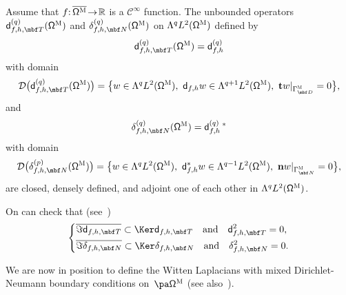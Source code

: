 \begin{proposition}
\begin{enumeratei}
\item\label{pr.QTNii}
Assume that $f{:}\,\overline{\mathsf \Omega^{\textsc{M}}}\!\to\! \mathbb R$ is a $\mathcal C^\infty$ function. The unbounded operators $\mathsf d_{f,h,\mbf T}^{(q)} (\mathsf \Omega^{\textsc{M}})$ and $\delta_{f,h,\mbf N}^{(q)} (\mathsf \Omega^{\textsc{M}})$ on $\Lambda^{q} L^{2} (\mathsf \Omega^{\textsc{M}})$
defined by
\[
\mathsf d_{f,h,\mbf T}^{(q)} (\mathsf \Omega^{\textsc{M}}) = \mathsf d_{f,h}^{(q)}
\]
with domain
\[
\mathcal D\bigl(\mathsf d_{f,h,\mbf T}^{(q)} (\mathsf \Omega^{\textsc{M}})\bigr)=\bigl\{w\in \Lambda^{q}L^2 (\mathsf \Omega^{\textsc{M}}),\ \mathsf d_{f,h}w \in \Lambda^{q+1}L^2(\mathsf \Omega^{\textsc{M}}),\ \mathbf{t}w|_{\Gamma^{\textsc{M}}_{\mbf D}}=0 \bigr\},
\]
and
\[
\delta_{f,h,\mbf N}^{(q)} (\mathsf \Omega^{\textsc{M}}) = \mathsf d_{f,h}^{(q)} \,^*
\]
with domain
\[
\mathcal D\bigl(\delta_{f,h,\mbf N}^{(p)} (\mathsf \Omega^{\textsc{M}})\bigr)=\bigl\{w\in \Lambda^{q} L^2 (\mathsf \Omega^{\textsc{M}}),\ \mathsf d^*_{f,h}w\in \Lambda^{q-1}L^2(\mathsf \Omega^{\textsc{M}}),\ \mathbf{n}w|_{\Gamma^{\textsc{M}}_{\mbf N}}=0 \bigr\},
\]
are closed, densely defined, and adjoint one of each other in $\Lambda^{q}L^2 (\mathsf \Omega^{\textsc{M}})$.
\end{enumeratei}
\end{proposition}

On can check that (see~\cite[Eq.\,(130]{DLLN})
\begin{equation}\label{eq.dom-dT}
\left\{
\begin{aligned}
&\overline{ \Im \mathsf d_{f,h,\mbf T}}\subset \Ker \mathsf d_{f,h,\mbf T} \quad\text{and}\quad \mathsf d_{f,h,\mbf T}^{2}=0,\\
&\overline{ \Im \delta_{f,h,\mbf N}}\subset \Ker \delta_{f,h,\mbf N} \quad\text{and}\quad
\delta_{f,h,\mbf N}^{2}=0.
\end{aligned}
\right.
\end{equation}

 We are now in
position to define the Witten Laplacians with mixed Dirichlet-Neumann boundary conditions on~$\pa \mathsf \Omega^{\textsc{M}}$ (see also~\cite[p.\,89]{DLLN}).

